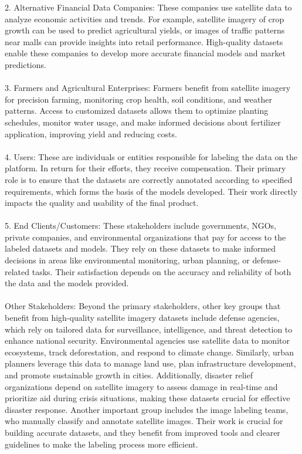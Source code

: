 \documentclass{article}
\begin{document}
2.	Alternative Financial Data Companies: These companies use satellite data to analyze economic activities and trends. For example, satellite imagery of crop growth can be used to predict agricultural yields, or images of traffic patterns near malls can provide insights into retail performance. High-quality datasets enable these companies to develop more accurate financial models and market predictions. \\
\\

3.	Farmers and Agricultural Enterprises: Farmers benefit from satellite imagery for precision farming, monitoring crop health, soil conditions, and weather patterns. Access to customized datasets allows them to optimize planting schedules, monitor water usage, and make informed decisions about fertilizer application, improving yield and reducing costs. \\
\\

4.	Users: These are individuals or entities responsible for labeling the data on the platform. In return for their efforts, they receive compensation. Their primary role is to ensure that the datasets are correctly annotated according to specified requirements, which forms the basis of the models developed. Their work directly impacts the quality and usability of the final product. \\
\\

5.	End Clients/Customers: These stakeholders include governments, NGOs, private companies, and environmental organizations that pay for access to the labeled datasets and models. They rely on these datasets to make informed decisions in areas like environmental monitoring, urban planning, or defense-related tasks. Their satisfaction depends on the accuracy and reliability of both the data and the models provided. \\
\\


Other Stakeholders: Beyond the primary stakeholders, other key groups that benefit from high-quality satellite imagery datasets include defense agencies, which rely on tailored data for surveillance, intelligence, and threat detection to enhance national security. Environmental agencies use satellite data to monitor ecosystems, track deforestation, and respond to climate change. Similarly, urban planners leverage this data to manage land use, plan infrastructure development, and promote sustainable growth in cities. Additionally, disaster relief organizations depend on satellite imagery to assess damage in real-time and prioritize aid during crisis situations, making these datasets crucial for effective disaster response. Another important group includes the image labeling teams, who manually classify and annotate satellite images. Their work is crucial for building accurate datasets, and they benefit from improved tools and clearer guidelines to make the labeling process more efficient. \\
\\
\end{document}
